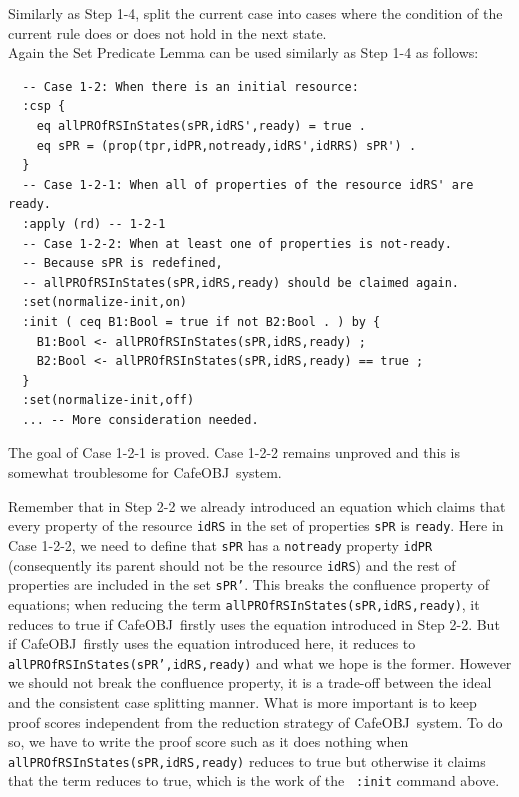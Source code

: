 \documentclass[12pt]{report}
\newcommand{\stt}[1]{{\small{\tt {#1}}}}
\newcommand{\cafeobj}{{\sf CafeOBJ}~}
\begin{document}
 Similarly as Step 1-4, split the current case
into cases where the condition of the current rule does or does not
hold in the next state. \\
Again the Set Predicate Lemma can be used similarly as Step 1-4 as follows:
\small
\begin{verbatim}
  -- Case 1-2: When there is an initial resource:
  :csp {
    eq allPROfRSInStates(sPR,idRS',ready) = true .
    eq sPR = (prop(tpr,idPR,notready,idRS',idRRS) sPR') .
  }
  -- Case 1-2-1: When all of properties of the resource idRS' are ready.
  :apply (rd) -- 1-2-1
  -- Case 1-2-2: When at least one of properties is not-ready.
  -- Because sPR is redefined, 
  -- allPROfRSInStates(sPR,idRS,ready) should be claimed again.
  :set(normalize-init,on)
  :init ( ceq B1:Bool = true if not B2:Bool . ) by {
    B1:Bool <- allPROfRSInStates(sPR,idRS,ready) ;
    B2:Bool <- allPROfRSInStates(sPR,idRS,ready) == true ;
  }
  :set(normalize-init,off)
  ... -- More consideration needed.
\end{verbatim}
\normalsize
The goal of Case 1-2-1 is proved. Case 1-2-2 remains unproved and this is somewhat
troublesome for \cafeobj system.

Remember that in Step 2-2 we already introduced an equation which
claims that every property of the resource {\tt idRS} in the set of
properties {\tt sPR} is {\tt ready}. Here in Case 1-2-2, we need to
define that {\tt sPR} has a {\tt notready} property {\tt idPR}
(consequently its parent should not be the resource {\tt idRS}) and
the rest of properties are included in the set {\tt sPR'}. This breaks
the confluence property of equations; when reducing the term
\stt{allPROfRSInStates(sPR,idRS,ready)}, it reduces to true if
\cafeobj firstly uses the equation introduced in Step 2-2. But if
\cafeobj firstly uses the equation introduced here, it reduces to
\stt{allPROfRSInStates(sPR',idRS,ready)} and what we hope is the
former. However we should not break the confluence property, it is a
trade-off between the ideal and the consistent case splitting manner.
What is more important is to keep proof scores independent from the
reduction strategy of \cafeobj system. To do so, we have to write the
proof score such as it does nothing when
\stt{allPROfRSInStates(sPR,idRS,ready)} reduces to true but otherwise
it claims that the term reduces to true, which is the work of the {\tt
  :init} command above.
\end{document}
